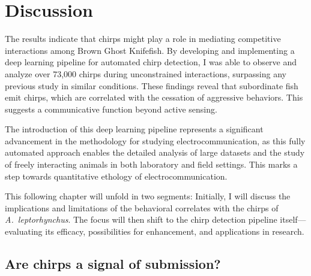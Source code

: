 \chapter{Discussion}
\label{chap:discussion}

The results indicate that chirps might play a role in mediating competitive
interactions among Brown Ghost Knifefish. By developing and implementing a deep
learning pipeline for automated chirp detection, I was able to observe and
analyze over 73,000 chirps during unconstrained interactions, surpassing any
previous study in similar conditions. These findings reveal that subordinate
fish emit chirps, which are correlated with the cessation of aggressive
behaviors. This suggests a communicative function beyond active sensing.

The introduction of this deep learning pipeline represents a significant
advancement in the methodology for studying electrocommunication, as this fully
automated approach enables the detailed analysis of large datasets and the
study of freely interacting animals in both laboratory and field settings. This
marks a step towards quantitative ethology of electrocommunication.

This following chapter will unfold in two segments: Initially, I will discuss
the implications and limitations of the behavioral correlates with the chirps
of \textit{A.~leptorhynchus}. The focus will then shift to the chirp detection
pipeline itself—evaluating its efficacy, possibilities for enhancement, and
applications in research.

\section{Are chirps a signal of submission?}

